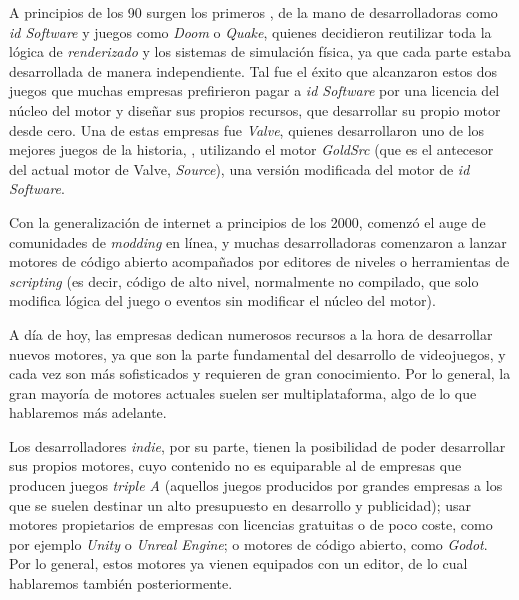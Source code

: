 \smallskip

A principios de los 90 surgen los primeros , de la mano de desarrolladoras como \textit{id Software} y juegos como \textit{Doom} o \textit{Quake}, quienes decidieron reutilizar toda la lógica de \textit{renderizado} y los sistemas de simulación física, ya que cada parte estaba desarrollada de manera independiente. Tal fue el éxito que alcanzaron estos dos juegos que muchas empresas prefirieron pagar a \textit{id Software} por una licencia del núcleo del motor y diseñar sus propios recursos, que desarrollar su propio motor desde cero. Una de estas empresas fue \textit{Valve}, quienes desarrollaron uno de los mejores juegos de la historia, , utilizando el motor \textit{GoldSrc} (que es el antecesor del actual motor de Valve, \textit{Source}), una versión modificada del motor de \textit{id Software}.

\medskip

Con la generalización de internet a principios de los 2000, comenzó el auge de comunidades de \textit{modding} en línea, y muchas desarrolladoras comenzaron a lanzar motores de código abierto acompañados por editores de niveles o herramientas de \textit{scripting} (es decir, código de alto nivel, normalmente no compilado, que solo modifica lógica del juego o eventos sin modificar el núcleo del motor).

\smallskip

A día de hoy, las empresas dedican numerosos recursos a la hora de desarrollar nuevos motores, ya que son la parte fundamental del desarrollo de videojuegos, y cada vez son más sofisticados y requieren de gran conocimiento. Por lo general, la gran mayoría de motores actuales suelen ser multiplataforma, algo de lo que hablaremos más adelante.

\smallskip

Los desarrolladores \textit{indie}, por su parte, tienen la posibilidad de poder desarrollar sus propios motores, cuyo contenido no es equiparable al de empresas que producen juegos \textit{triple A} (aquellos juegos producidos por grandes empresas a los que se suelen destinar un alto presupuesto en desarrollo y publicidad); usar motores propietarios de empresas con licencias gratuitas o de poco coste, como por ejemplo \textit{Unity} o \textit{Unreal Engine}; o motores de código abierto, como \textit{Godot}. Por lo general, estos motores ya vienen equipados con un editor, de lo cual hablaremos también posteriormente.

